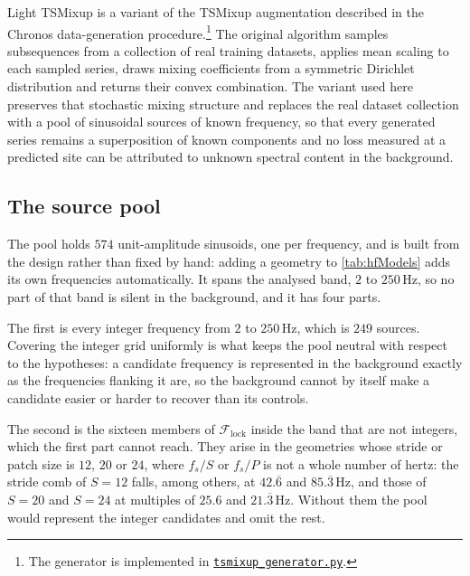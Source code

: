 

\medskip 

Light TSMixup is a variant of the TSMixup augmentation described in the Chronos data-generation procedure\autocite{ansariChronosLearningLanguage2024}.\footnote{The generator is implemented in \href{https://github.com/FedericoSabbadini/patchAliasing/blob/main/notebooks/data/synthetic/generators/tsmixup_generator.py}{\texttt{tsmixup\_generator.py}}.} The original algorithm samples subsequences from a collection of real training datasets, applies mean scaling to each sampled series, draws mixing coefficients from a symmetric Dirichlet distribution and returns their convex combination. The variant used here preserves that stochastic mixing structure and replaces the real dataset collection with a pool of sinusoidal sources of known frequency, so that every generated series remains a superposition of known components and no loss measured at a predicted site can be attributed to unknown spectral content in the background.

\subsection{The source pool}

The pool holds $574$ unit-amplitude sinusoids, one per frequency, and is built from the design rather than fixed by hand: adding a geometry to \autoref{tab:hfModels} adds its own frequencies automatically. It spans the analysed band, $2$ to $250$\,Hz, so no part of that band is silent in the background, and it has four parts.

The first is every integer frequency from $2$ to $250$\,Hz, which is $249$ sources. Covering the integer grid uniformly is what keeps the pool neutral with respect to the hypotheses: a candidate frequency is represented in the background exactly as the frequencies flanking it are, so the background cannot by itself make a candidate easier or harder to recover than its controls.

The second is the sixteen members of $\mathcal F_{\mathrm{lock}}$ inside the band that are not integers, which the first part cannot reach. They arise in the geometries whose stride or patch size is $12$, $20$ or $24$, where $f_s/S$ or $f_s/P$ is not a whole number of hertz: the stride comb of $S=12$ falls, among others, at $42.\overline{6}$ and $85.\overline{3}$\,Hz, and those of $S=20$ and $S=24$ at multiples of $25.6$ and $21.\overline{3}$\,Hz. Without them the pool would represent the integer candidates and omit the rest.

